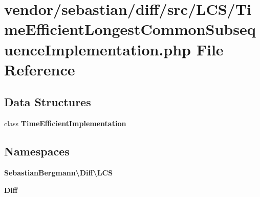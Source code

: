 \section{vendor/sebastian/diff/src/\+L\+C\+S/\+Time\+Efficient\+Longest\+Common\+Subsequence\+Implementation.php File Reference}
\label{_time_efficient_longest_common_subsequence_implementation_8php}
\subsection*{Data Structures}
\begin{DoxyCompactItemize}
\item 
class {\bf Time\+Efficient\+Implementation}
\end{DoxyCompactItemize}
\subsection*{Namespaces}
\begin{DoxyCompactItemize}
\item 
 {\bf Sebastian\+Bergmann\textbackslash{}\+Diff\textbackslash{}\+L\+C\+S}
\item 
 {\bf Diff}
\end{DoxyCompactItemize}
